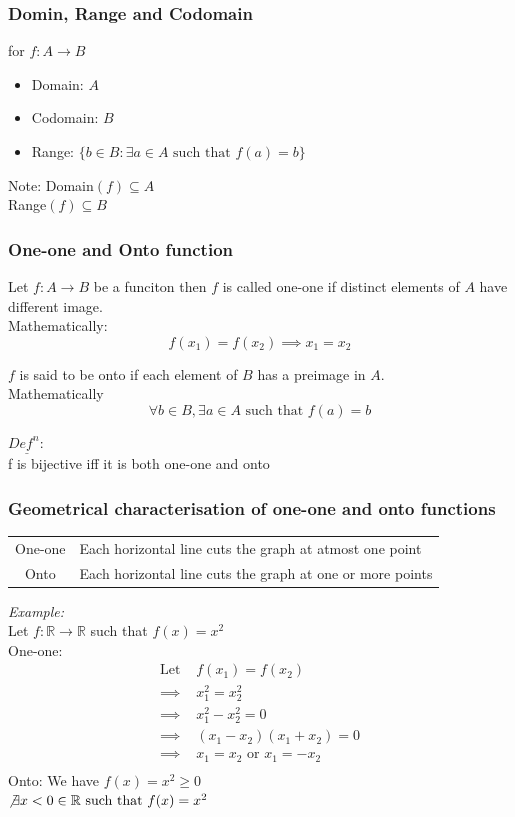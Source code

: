 \documentclass[11pt,letterpaper]{article}
\newenvironment{example}                             
        {\textit{Example:}\\}
	{}
\newenvironment{definition}
	{\begin{mdframed}$\underline{\textit{Def}^\textit{n}:} $\\}
	{\end{mdframed}}
\begin{document}
\subsubsection{Domin, Range and Codomain}
for $f: A \rightarrow B$
\begin{itemize}
  \item Domain: $A$
  \item Codomain: $B$
  \item Range: $\{b \in B: \exists a \in A \text{ such that } f(a) = b\}$
\end{itemize}
Note:
\indent  Domain$(f) \subseteq A$\\
\indent  Range$(f) \subseteq B$\\
\subsubsection{One-one and Onto function}
Let $f:A\rightarrow B$ be a funciton then $f$ is called one-one if distinct elements of $A$ have different image.\\
Mathematically:
\[
  f(x_1) = f(x_2) \implies x_1 = x_2
\]

$f$ is said to be onto if each element of $B$ has a preimage in $A$.\\
Mathematically
\[
  \forall b \in B, \exists a \in A \text{ such that } f(a) = b
\]

\begin{definition}
  f is bijective iff it is both one-one and onto
\end{definition}

\subsubsection{Geometrical characterisation of one-one and onto functions}
\begin{centering}
  \begin{table}
    \begin{tabular}{c l}
      One-one & Each horizontal line cuts the graph at atmost one point\\
      Onto & Each horizontal line cuts the graph at one or more points\\
    \end{tabular}
  \end{table}
\end{centering}
\begin{example}
  Let $f: \mathbb{R} \to \mathbb{R}$ such that $f(x) = x^2$\\ 
  One-one: 
  \begin{align*}
    \text{Let }&f(x_1) = f(x_2) \\
    \implies & x_1^2 = x_2^2 \\
    \implies & x_1^2 - x_2^2 = 0 \\
    \implies & (x_1 - x_2)(x_1 + x_2) = 0 \\
    \implies & x_1 = x_2 \text{ or } x_1 = -x_2\\
  \end{align*}
  Onto:
  We have $f(x) = x^2 \geq 0$\\
  $\not \exists x < 0 \in \mathbb{R} \text{ such that } f(x) = x^2$
\end{example}
\end{document}
